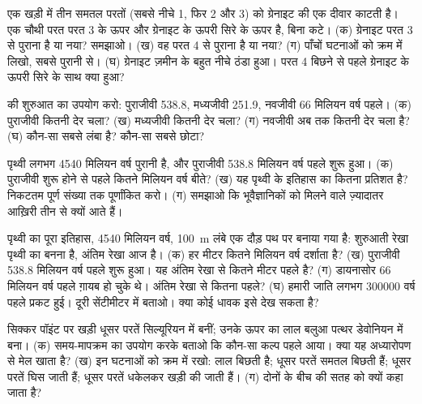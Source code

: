 \begin{exercise}[$\star\star$]\label{exo:g7:geological-time:5}
एक खड़ी  में तीन समतल परतों (सबसे नीचे 1, फिर 2 और 3) को ग्रेनाइट की एक
दीवार काटती है। एक चौथी परत परत 3 के ऊपर और ग्रेनाइट के ऊपरी सिरे के ऊपर है, बिना
कटे। (क) ग्रेनाइट परत 3 से पुराना है या नया? समझाओ। (ख) वह परत 4 से पुराना है
या नया? (ग) पाँचों घटनाओं को क्रम में लिखो, सबसे पुरानी से। (घ) ग्रेनाइट ज़मीन
के बहुत नीचे ठंडा हुआ। परत 4 बिछने से पहले ग्रेनाइट के ऊपरी सिरे के साथ क्या
हुआ?
\end{exercise}

\begin{exercise}[$\star\star$]\label{exo:g7:geological-time:6}
 की शुरुआत का उपयोग करो: पुराजीवी \num{538.8}, मध्यजीवी \num{251.9},
नवजीवी \num{66} मिलियन वर्ष पहले। (क) पुराजीवी कितनी देर चला? (ख) मध्यजीवी
कितनी देर चला? (ग) नवजीवी अब तक कितनी देर चला है? (घ) कौन-सा  सबसे लंबा
है? कौन-सा सबसे छोटा?
\end{exercise}

\begin{exercise}[$\star\star$]\label{exo:g7:geological-time:7}
पृथ्वी लगभग \num{4540} मिलियन वर्ष पुरानी है, और पुराजीवी \num{538.8} मिलियन
वर्ष पहले शुरू हुआ। (क) पुराजीवी शुरू होने से पहले कितने मिलियन वर्ष बीते? (ख) यह
पृथ्वी के इतिहास का कितना प्रतिशत है? निकटतम पूर्ण संख्या तक पूर्णांकित करो।
(ग) समझाओ कि भूवैज्ञानिकों को मिलने वाले ज़्यादातर  आख़िरी तीन  से
क्यों आते हैं।
\end{exercise}

\begin{exercise}[$\star\star$]\label{exo:g7:geological-time:8}
पृथ्वी का पूरा इतिहास, \num{4540} मिलियन वर्ष, \qty{100}{m} लंबे एक दौड़ पथ पर
बनाया गया है: शुरुआती रेखा पृथ्वी का बनना है, अंतिम रेखा आज है। (क) हर मीटर कितने
मिलियन वर्ष दर्शाता है? (ख) पुराजीवी \num{538.8} मिलियन वर्ष पहले शुरू हुआ। यह
अंतिम रेखा से कितने मीटर पहले है? (ग) डायनासोर \num{66} मिलियन वर्ष पहले ग़ायब हो
चुके थे। अंतिम रेखा से कितना पहले? (घ) हमारी जाति लगभग \num{300000} वर्ष पहले
प्रकट हुई। दूरी सेंटीमीटर में बताओ। क्या कोई धावक इसे देख
सकता है?
\end{exercise}

\begin{exercise}[$\star\star$]\label{exo:g7:geological-time:9}
सिक्कर पॉइंट पर खड़ी धूसर परतें सिल्यूरियन में बनीं; उनके ऊपर का लाल बलुआ पत्थर
डेवोनियन में बना। (क) समय-मापक्रम का उपयोग करके बताओ कि कौन-सा कल्प पहले आया। क्या
यह अध्यारोपण से मेल खाता है? (ख) इन घटनाओं को क्रम में रखो: लाल  बिछती है; धूसर
परतें समतल बिछती हैं; धूसर परतें घिस जाती हैं; धूसर परतें धकेलकर खड़ी की जाती हैं।
(ग) दोनों  के बीच की सतह को  क्यों कहा
जाता है?
\end{exercise}

